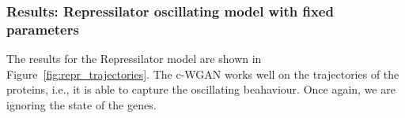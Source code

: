 \documentclass{article}
\begin{document}
\subsubsection{Results: Repressilator oscillating model with fixed parameters}

The results for the Repressilator model are shown in Figure~\ref{fig:repr_trajectories}. The c-WGAN works well on the trajectories of the proteins, i.e., it is able to capture the oscillating beahaviour. Once again, we are ignoring the state of the genes. 

\begin{figure}[ht]
    \centering
\end{figure}
\end{document}
